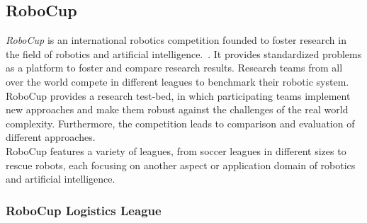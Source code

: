 \documentclass[a4paper,11pt]{article}
\begin{document}
\subsection{RoboCup}
\label{sec:robocup}
\emph{RoboCup} is an international robotics competition founded to
foster research in the field of robotics and artificial
intelligence.~\cite{RoboCup-Paper}. It provides standardized problems as a
platform to foster and compare research results. Research
teams from all over the world compete in different leagues to
benchmark their robotic system. RoboCup provides a research
test-bed, in which participating teams implement new approaches and
make them robust against the challenges of the real world
complexity. Furthermore, the competition leads to comparison and
evaluation of different approaches.\\
%
RoboCup features a variety of leagues, from soccer leagues in
different sizes to rescue robots, each focusing on another aspect or
application domain of robotics and artificial intelligence.



\subsubsection{RoboCup Logistics League}
\end{document}
